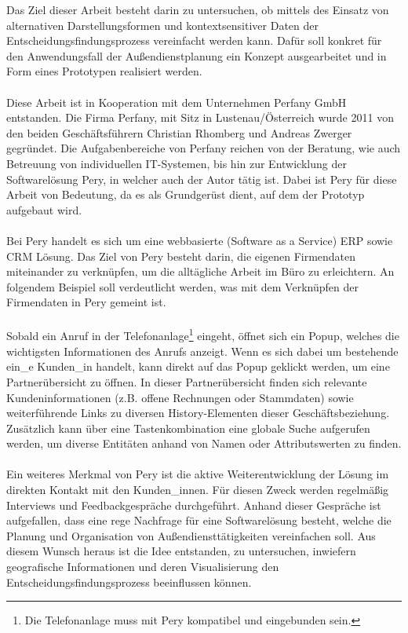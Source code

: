 \documentclass[Bachelorarbeit.tex]{subfiles}
\begin{document}
Das Ziel dieser Arbeit besteht darin zu untersuchen, ob mittels des Einsatz von alternativen Darstellungsformen und kontextsensitiver Daten der Entscheidungsfindungsprozess vereinfacht werden kann. 
Dafür soll konkret für den Anwendungsfall der Außendienstplanung ein Konzept ausgearbeitet und in Form eines Prototypen realisiert werden. \\
\\
Diese Arbeit ist in Kooperation mit dem Unternehmen Perfany GmbH entstanden.
Die Firma Perfany, mit Sitz in Lustenau/Österreich wurde 2011 von den beiden Geschäftsführern Christian Rhomberg und Andreas Zwerger gegründet.
Die Aufgabenbereiche von Perfany reichen von der Beratung, wie auch Betreuung von individuellen IT-Systemen, bis hin zur Entwicklung der Softwarelösung Pery, in welcher auch der Autor tätig ist. 
Dabei ist Pery für diese Arbeit von Bedeutung, da es als Grundgerüst dient, auf dem der Prototyp aufgebaut wird.\\
\\
Bei Pery handelt es sich um eine webbasierte (Software as a Service) \ac{ERP} sowie \ac{CRM} Lösung.
Das Ziel von Pery besteht darin, die eigenen Firmendaten miteinander zu verknüpfen, um die alltägliche Arbeit im Büro zu erleichtern.
An folgendem Beispiel soll verdeutlicht werden, was mit dem Verknüpfen der Firmendaten in Pery gemeint ist.\\
\\
Sobald ein Anruf in der Telefonanlage\footnote{Die Telefonanlage muss mit Pery kompatibel und eingebunden sein.} eingeht, öffnet sich ein Popup, welches die wichtigsten Informationen des Anrufs anzeigt. 
Wenn es sich dabei um bestehende ein\_e Kunden\_in handelt, kann direkt auf das Popup geklickt werden, um eine Partnerübersicht zu öffnen.
In dieser Partnerübersicht finden sich relevante Kundeninformationen (z.B. offene Rechnungen oder Stammdaten) sowie weiterführende Links zu diversen History-Elementen dieser Geschäftsbeziehung.
Zusätzlich kann über eine Tastenkombination eine globale Suche aufgerufen werden, um diverse Entitäten anhand von Namen oder Attributswerten zu finden. \\
\\
Ein weiteres Merkmal von Pery ist die aktive Weiterentwicklung der Lösung im direkten Kontakt mit den Kunden\_innen.
Für diesen Zweck werden regelmäßig Interviews und Feedbackgespräche durchgeführt.
Anhand dieser Gespräche ist aufgefallen, dass eine rege Nachfrage für eine Softwarelösung besteht, welche die Planung und Organisation von Außendiensttätigkeiten vereinfachen soll.
Aus diesem Wunsch heraus ist die Idee entstanden, zu untersuchen, inwiefern geografische Informationen und deren Visualisierung den Entscheidungsfindungsprozess beeinflussen können.
\end{document}
